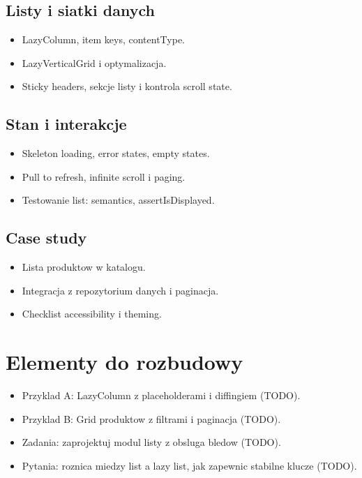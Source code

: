 \subsection{Listy i siatki danych}
\begin{itemize}
  \item LazyColumn, item keys, contentType.
  \item LazyVerticalGrid i optymalizacja.
  \item Sticky headers, sekcje listy i kontrola scroll state.
\end{itemize}

\subsection{Stan i interakcje}
\begin{itemize}
  \item Skeleton loading, error states, empty states.
  \item Pull to refresh, infinite scroll i paging.
  \item Testowanie list: semantics, assertIsDisplayed.
\end{itemize}

\subsection{Case study}
\begin{itemize}
  \item Lista produktow w katalogu.
  \item Integracja z repozytorium danych i paginacja.
  \item Checklist accessibility i theming.
\end{itemize}

\section{Elementy do rozbudowy}
\begin{itemize}
  \item Przyklad A: LazyColumn z placeholderami i diffingiem (TODO).
  \item Przyklad B: Grid produktow z filtrami i paginacja (TODO).
  \item Zadania: zaprojektuj modul listy z obsluga bledow (TODO).
  \item Pytania: roznica miedzy list a lazy list, jak zapewnic stabilne klucze (TODO).
\end{itemize}



